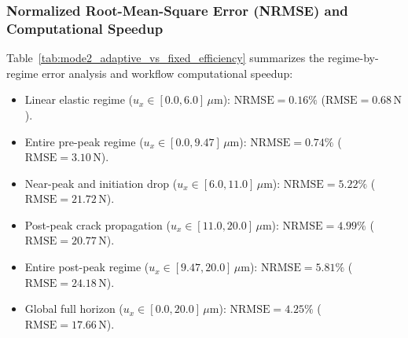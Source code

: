 \subsubsection{Normalized Root-Mean-Square Error (NRMSE) and Computational Speedup}
Table~\ref{tab:mode2_adaptive_vs_fixed_efficiency} summarizes the regime-by-regime error analysis and workflow computational speedup:
\begin{itemize}
  \item Linear elastic regime ($u_x \in [0.0, 6.0]\,\mu\mathrm{m}$): $\mathrm{NRMSE} = \mathbf{0.16\%}$ ($\mathrm{RMSE} = 0.68\,\mathrm{N}$).
  \item Entire pre-peak regime ($u_x \in [0.0, 9.47]\,\mu\mathrm{m}$): $\mathrm{NRMSE} = \mathbf{0.74\%}$ ($\mathrm{RMSE} = 3.10\,\mathrm{N}$).
  \item Near-peak and initiation drop ($u_x \in [6.0, 11.0]\,\mu\mathrm{m}$): $\mathrm{NRMSE} = \mathbf{5.22\%}$ ($\mathrm{RMSE} = 21.72\,\mathrm{N}$).
  \item Post-peak crack propagation ($u_x \in [11.0, 20.0]\,\mu\mathrm{m}$): $\mathrm{NRMSE} = \mathbf{4.99\%}$ ($\mathrm{RMSE} = 20.77\,\mathrm{N}$).
  \item Entire post-peak regime ($u_x \in [9.47, 20.0]\,\mu\mathrm{m}$): $\mathrm{NRMSE} = \mathbf{5.81\%}$ ($\mathrm{RMSE} = 24.18\,\mathrm{N}$).
  \item Global full horizon ($u_x \in [0.0, 20.0]\,\mu\mathrm{m}$): $\mathrm{NRMSE} = \mathbf{4.25\%}$ ($\mathrm{RMSE} = 17.66\,\mathrm{N}$).
\end{itemize}

